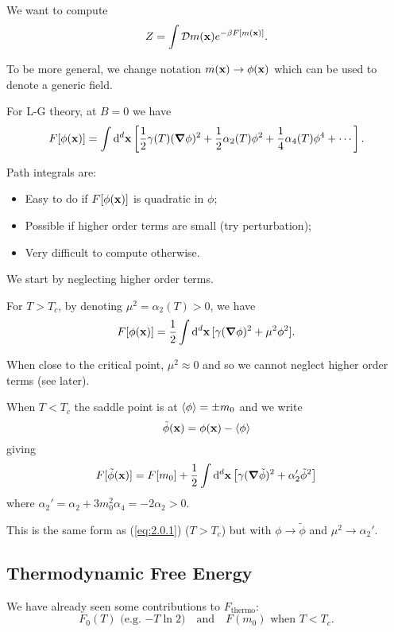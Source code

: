 \documentclass[a4paper,11pt]{article}
\begin{document}
	We want to compute
	\[
		Z = \int \mathcal{D} m(\vb x) e ^{- \beta F[m(\vb x)]}.
	\]
	
	To be more general, we change notation $m(\vb x)\to \phi(\vb x)$ which can be used to denote a generic field.
	
	For L-G theory, at $B = 0$ we have
	\[
		F[\phi(\vb x)]= \int \dd[d]{\vb x} \left[ \frac{1}{2} \gamma(T) (\grad \phi)^2 + \frac{1}{2} \alpha_2(T) \phi^2 + \frac{1}{4} \alpha_4 (T) \phi^4 + \cdots \right].
	\]

	Path integrals are:
	\begin{itemize}
		\item Easy to do if $F[\phi(\vb x)]$ is quadratic in $\phi$;
		\item Possible if higher order terms are small (try perturbation);
		\item Very difficult to compute otherwise.
	\end{itemize}

	We start by neglecting higher order terms.

	For $T > T_c$, by denoting $\mu^2 = \alpha_2(T) > 0$, we have
	\begin{equation}
		F[\phi(\vb x)] = \frac{1}{2} \int \dd[d]{\vb x} [\gamma(\grad \phi)^2 + \mu^2 \phi^2].
		\label{eq:2.0.1}
	\end{equation}

	\begin{nt}
		When close to the critical point, $\mu^2 \approx 0$ and so we cannot neglect higher order terms (see later).
	\end{nt}

	When $T < T_c$ the saddle point is at $\expval{\phi} = \pm m_0$ and we write
	\[
		\tilde{\phi}(\vb x) = \phi(\vb x)-\expval{\phi}
	\]
	giving
	\[
		F[\tilde{\phi}(\vb x)] = F[m_0] + \frac{1}{2} \int \dd[d]{\vb x} \left[ \gamma (\grad \tilde \phi)^2 + \alpha_2' \tilde \phi^2 \right]
	\]
	where $\alpha_2' = \alpha_2 + 3 m_0^2 \alpha_4 = - 2 \alpha_2 > 0$.

	This is the same form as (\ref{eq:2.0.1}) ($T > T_c$) but with $\phi \to \tilde \phi$ and $\mu^2 \to \alpha_2'$.

	\subsection{Thermodynamic Free Energy}

	We have already seen some contributions to $F _{\text{thermo}}$:
	\[
		F_0(T) \text{ (e.g.\ $-T \ln 2$)} \quad \text{and} \quad \text{$F(m_0)$ when $T<T_c$}.
	\]
	
\end{document}
